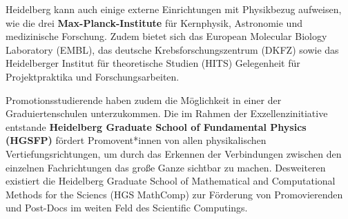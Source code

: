 Heidelberg kann auch einige externe Einrichtungen mit Physikbezug aufweisen, wie die drei \textbf{Max-Planck-Institute} für Kernphysik, Astronomie und medizinische Forschung. Zudem bietet sich das European Molecular Biology Laboratory (EMBL), das deutsche Krebsforschungszentrum (DKFZ) sowie das Heidelberger Institut für theoretische Studien (HITS) Gelegenheit für Projektpraktika und Forschungsarbeiten.

Promotionsstudierende haben zudem die Möglichkeit in einer der Graduiertenschulen unterzukommen. 
Die im Rahmen der Exzellenzinitiative entstande \textbf{Heidelberg Graduate School of Fundamental Physics (HGSFP)} fördert Promovent*innen von  allen physikalischen Vertiefungsrichtungen, um durch das Erkennen der Verbindungen zwischen den einzelnen Fachrichtungen das große Ganze sichtbar zu machen.
Desweiteren existiert die Heidelberg Graduate School of Mathematical and Computational Methods for the Sciencs (HGS MathComp) zur Förderung von Promovierenden und Post-Docs im weiten Feld des Scientific Computings.\\

%
%